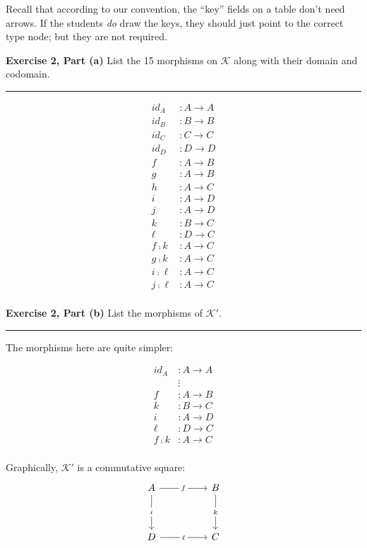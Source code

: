 \documentclass{article}
\newcommand{\Break}{\vspace{0.2cm}\hrule{}\vspace{0.2cm}}
\begin{document}
Recall that according to our convention, the ``key'' fields on a table don't
need arrows. If the students \textit{do} draw the keys, they should just point
to the correct type node; but they are not required.

\newpage{}

\noindent\textbf{Exercise 2, Part (a)} List the 15 morphisms on $\mathcal{K}$
along with their domain and codomain.

\Break{}

\begin{align*}
  id_A &: A \to A \\
  id_B &: B \to B \\
  id_C &: C \to C \\
  id_D &: D \to D \\
  f &: A \to B \\
  g &: A \to B \\
  h &: A \to C \\
  i &: A \to D \\
  j &: A \to D \\
  k &: B \to C \\
  \ell &: D \to C \\
  f \fcmp k &: A \to C \\
  g \fcmp k &: A \to C \\
  i \fcmp \ell &: A \to C \\
  j \fcmp \ell &: A \to C \\
\end{align*}

\newpage{}

\noindent\textbf{Exercise 2, Part (b)} List the morphisms of
$\mathcal{K}'$.

\Break{}

The morphisms here are quite simpler:

\begin{align*}
  id_A &: A \to A \\
    &\vdots \\
  f &: A \to B \\
  k &: B \to C \\
  i &: A \to D \\
  \ell &: D \to C \\
  f \fcmp k &: A \to C \\
\end{align*}

Graphically, $\mathcal{K}'$ is a commutative square:
\[\begin{tikzcd}
	A && B \\
	\\
	D && C
	\arrow["f"{description}, from=1-1, to=1-3]
	\arrow["i"{description}, from=1-1, to=3-1]
	\arrow["k"{description}, from=1-3, to=3-3]
	\arrow["\ell"{description}, from=3-1, to=3-3]
\end{tikzcd}\]
\end{document}
